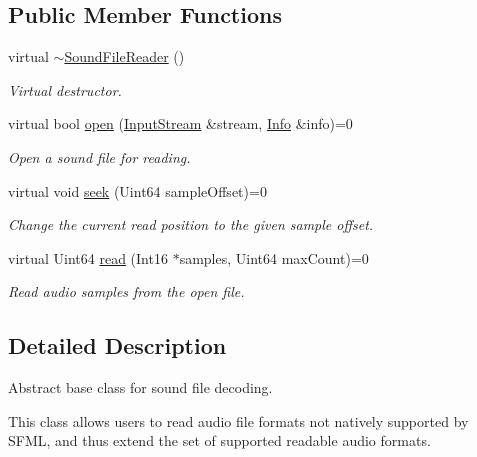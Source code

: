 \subsection*{Public Member Functions}
\begin{DoxyCompactItemize}
\item 
\mbox{\label{classsf_1_1_sound_file_reader_a34163297f302d15818c76b54f815acc8}} 
virtual \hyperlink{classsf_1_1_sound_file_reader_a34163297f302d15818c76b54f815acc8}{$\sim$\+Sound\+File\+Reader} ()
\begin{DoxyCompactList}\small\item\em Virtual destructor. \end{DoxyCompactList}\item 
virtual bool \hyperlink{classsf_1_1_sound_file_reader_aa1d2fee2ba8f359c833ab74590d55935}{open} (\hyperlink{classsf_1_1_input_stream}{Input\+Stream} \&stream, \hyperlink{structsf_1_1_sound_file_reader_1_1_info}{Info} \&info)=0
\begin{DoxyCompactList}\small\item\em Open a sound file for reading. \end{DoxyCompactList}\item 
virtual void \hyperlink{classsf_1_1_sound_file_reader_a1e18ade5ffe882bdfa20a2ebe7e2b015}{seek} (Uint64 sample\+Offset)=0
\begin{DoxyCompactList}\small\item\em Change the current read position to the given sample offset. \end{DoxyCompactList}\item 
virtual Uint64 \hyperlink{classsf_1_1_sound_file_reader_a3b7d86769ea07e24e7b0f0486bed7591}{read} (Int16 $\ast$samples, Uint64 max\+Count)=0
\begin{DoxyCompactList}\small\item\em Read audio samples from the open file. \end{DoxyCompactList}\end{DoxyCompactItemize}


\subsection{Detailed Description}
Abstract base class for sound file decoding. 

This class allows users to read audio file formats not natively supported by S\+F\+ML, and thus extend the set of supported readable audio formats.

